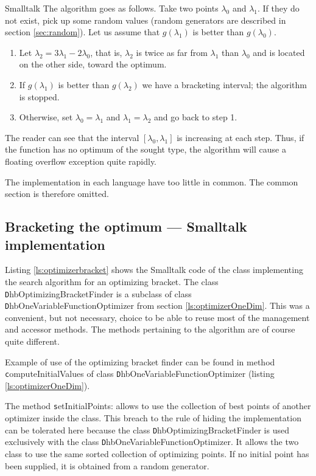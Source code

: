\begin{displaycode}{Smalltalk}
The algorithm goes as follows. Take two points $\lambda_0$ and
$\lambda_1$. If they do not exist, pick up some random values
(random generators are described in section \ref{sec:random}). Let
us assume that $g\left(\lambda_1\right)$ is better than
$g\left(\lambda_0\right)$.
\begin{enumerate}
  \item Let $\lambda_2=3\lambda_1-2\lambda_0$, that is, $\lambda_2$ is twice as far from $\lambda_1$ than
$\lambda_0$ and is located on the other side, toward the optimum.
  \item If $g\left(\lambda_1\right)$ is better than
$g\left(\lambda_2\right)$ we have a bracketing interval; the
algorithm is stopped.
  \item Otherwise, set $\lambda_0=\lambda_1$ and $\lambda_1=\lambda_2$ and go back to step 1.
\end{enumerate}
The reader can see that the interval
$\left[\lambda_0,\lambda_1\right]$ is increasing at each step.
Thus, if the function has no optimum of the sought type, the
algorithm will cause a floating overflow exception quite rapidly.

\noindent The implementation in each language have too little in
common. The common section is therefore omitted.

\subsection{Bracketing the optimum --- Smalltalk implementation}
\label{sec:sbracket}  Listing
\ref{ls:optimizerbracket} shows the Smalltalk code of the class
implementing the search algorithm for an optimizing bracket. The
class {\texttt DhbOptimizingBracketFinder} is a subclass of class {\texttt
DhbOneVariableFunctionOptimizer} from section
\ref{ls:optimizerOneDim}. This was a convenient, but not
necessary, choice to be able to reuse most of the management and
accessor methods. The methods pertaining to the algorithm are of
course quite different.

Example of use of the optimizing bracket finder can be found in
method {\texttt computeInitialValues} of class {\texttt
DhbOneVariableFunctionOptimizer} (\cf listing
\ref{ls:optimizerOneDim}).

The method {\texttt setInitialPoints:} allows to use the collection of
best points of another optimizer inside the class. This breach to
the rule of hiding the implementation can be tolerated here
because the class {\texttt DhbOptimizingBracketFinder} is used
exclusively with the class {\texttt DhbOneVariableFunctionOptimizer}.
It allows the two class to use the same sorted collection of
optimizing points. If no initial point has been supplied, it is
obtained from a random generator.


\end{displaycode}
